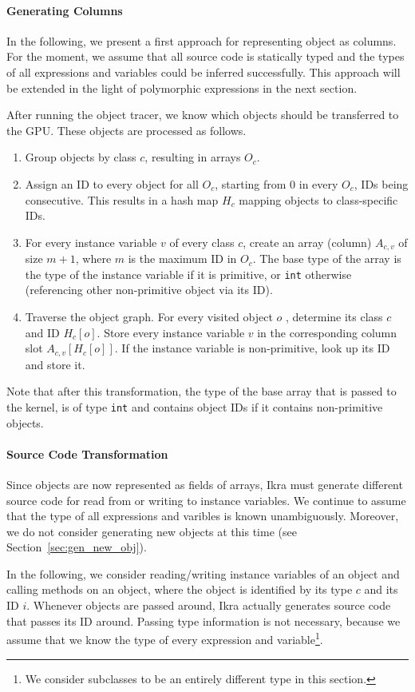 \documentclass[preprint]{sigplanconf}
\begin{document}
\paragraph{Generating Columns}
In the following, we present a first approach for representing object as columns. For the moment, we assume that all source code is statically typed and the types of all expressions and variables could be inferred successfully. This approach will be extended in the light of polymorphic expressions in the next section.

After running the object tracer, we know which objects should be transferred to the GPU. These objects are processed as follows.
\begin{enumerate}
    \item Group objects by class $c$, resulting in arrays $O_c$.
    \item Assign an ID to every object for all $O_c$, starting from $0$ in every $O_c$, IDs being consecutive. This results in a hash map $H_c$ mapping objects to class-specific IDs.
    \item For every instance variable $v$ of every class $c$, create an array (column) $A_{c,v}$ of size $m + 1$, where $m$ is the maximum ID in $O_c$. The base type of the array is the type of the instance variable if it is primitive, or \texttt{int} otherwise (referencing other non-primitive object via its ID).
    \item Traverse the object graph. For every visited object $o$ , determine its class $c$ and ID $H_c[o]$. Store every instance variable $v$ in the corresponding column slot $A_{c, v}[H_c[o]]$. If the instance variable is non-primitive, look up its ID and store it.
\end{enumerate}
Note that after this transformation, the type of the base array that is passed to the kernel, is of type \texttt{int} and contains object IDs if it contains non-primitive objects.

\paragraph{Source Code Transformation}
Since objects are now represented as fields of arrays, Ikra must generate different source code for read from or writing to instance variables. We continue to assume that the type of all expressions and varibles is known unambiguously. Moreover, we do not consider generating new objects at this time (see Section~\ref{sec:gen_new_obj}).

In the following, we consider reading/writing instance variables of an object and calling methods on an object, where the object is identified by its type $c$ and its ID $i$. Whenever objects are passed around, Ikra actually generates source code that passes its ID around. Passing type information is not necessary, because we assume that we know the type of every expression and variable\footnote{We consider subclasses to be an entirely different type in this section.}.
\end{document}
